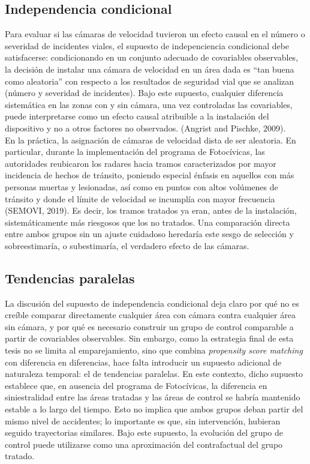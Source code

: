 \subsection{Independencia condicional}
\noindent Para evaluar si las cámaras de velocidad tuvieron un efecto causal en el número o severidad de incidentes viales, el supuesto de indepenciencia condicional debe satisfacerse: condicionando en un conjunto adecuado de covariables observables, la decisión de instalar una cámara de velocidad en un área dada es “tan buena como aleatoria” con respecto a los resultados de seguridad vial que se analizan (número y severidad de incidentes). Bajo este supuesto, cualquier diferencia sistemática en las zonas con y sin cámara, una vez controladas las covariables, puede interpretarse como un efecto causal atribuible a la instalación del dispositivo y no a otros factores no observados. (Angrist and Pischke, 2009).\\

En la práctica, la asignación de cámaras de velocidad dista de ser aleatoria. En particular, durante la implementación del programa de Fotoc\'ivicas, las autoridades reubicaron los radares hacia tramos caracterizados por mayor incidencia de hechos de tránsito, poniendo especial énfasis en aquellos con más personas muertas y lesionadas, así como en puntos con altos volúmenes de tránsito y donde el límite de velocidad se incumplía con mayor frecuencia (SEMOVI, 2019). Es decir, los tramos tratados ya eran, antes de la instalación, sistemáticamente más riesgosos que los no tratados. Una comparación directa entre ambos grupos sin un ajuste cuidadoso heredaría este sesgo de selección y sobreestimaría, o subestimaría, el verdadero efecto de las cámaras.\\

\subsection{Tendencias paralelas}
\noindent La discusión del supuesto de independencia condicional deja claro por qué no es creíble comparar directamente cualquier área con cámara contra cualquier área sin cámara, y por qué es necesario construir un grupo de control comparable a partir de covariables observables. Sin embargo, como la estrategia final de esta tesis no se limita al emparejamiento, sino que combina \emph{propensity score matching} con diferencia en diferencias, hace falta introducir un supuesto adicional de naturaleza temporal: el de tendencias paralelas. En este contexto, dicho supuesto establece que, en ausencia del programa de Fotoc\'ivicas, la diferencia en siniestralidad entre las áreas tratadas y las áreas de control se habría mantenido estable a lo largo del tiempo. Esto no implica que ambos grupos deban partir del mismo nivel de accidentes; lo importante es que, sin intervención, hubieran seguido trayectorias similares. Bajo este supuesto, la evolución del grupo de control puede utilizarse como una aproximación del contrafactual del grupo tratado.\\

